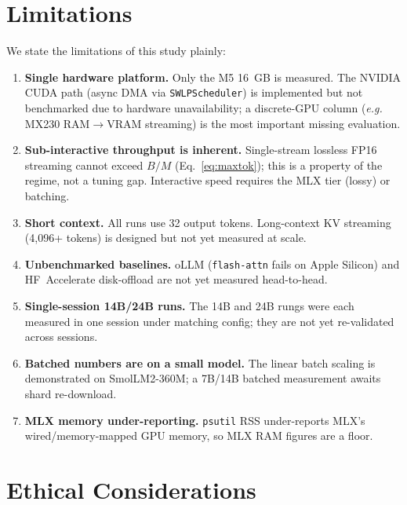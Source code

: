 \documentclass[10pt,a4paper]{article}
\newcommand{\eg}{\textit{e.g.}}
\begin{document}
\section{Limitations}
\label{sec:limitations}

We state the limitations of this study plainly:

\begin{enumerate}[leftmargin=2em]
  \item \textbf{Single hardware platform.} Only the M5 16~GB is measured. The
    NVIDIA CUDA path (async DMA via \texttt{SWLPScheduler}) is implemented but not
    benchmarked due to hardware unavailability; a discrete-GPU column (\eg{}
    MX230 RAM$\to$VRAM streaming) is the most important missing evaluation.
  \item \textbf{Sub-interactive throughput is inherent.} Single-stream lossless
    FP16 streaming cannot exceed $B/M$ (Eq.~\ref{eq:maxtok}); this is a property
    of the regime, not a tuning gap. Interactive speed requires the MLX tier
    (lossy) or batching.
  \item \textbf{Short context.} All runs use 32 output tokens. Long-context KV
    streaming (4{,}096+ tokens) is designed but not yet measured at scale.
  \item \textbf{Unbenchmarked baselines.} oLLM (\texttt{flash-attn} fails on
    Apple Silicon) and HF~Accelerate disk-offload are not yet measured head-to-head.
  \item \textbf{Single-session 14B/24B runs.} The 14B and 24B rungs were each
    measured in one session under matching config; they are not yet re-validated
    across sessions.
  \item \textbf{Batched numbers are on a small model.} The linear batch scaling is
    demonstrated on SmolLM2-360M; a 7B/14B batched measurement awaits shard
    re-download.
  \item \textbf{MLX memory under-reporting.} \texttt{psutil} RSS under-reports
    MLX's wired/memory-mapped GPU memory, so MLX RAM figures are a floor.
\end{enumerate}

\section{Ethical Considerations}
\label{sec:ethics}
\end{document}
